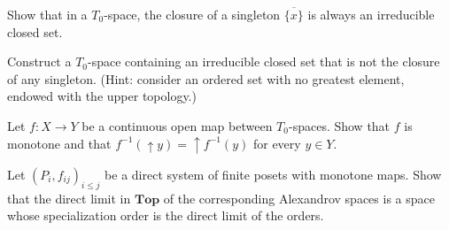\begin{exercise}
Show that in a $T_0$-space, the closure of a singleton $\overline{\{x\}}$ is always an
irreducible closed set.
\end{exercise}

\begin{exercise}
Construct a $T_0$-space containing an irreducible closed set that is not the closure of
any singleton. (Hint: consider an ordered set with no greatest element, endowed with the
upper topology.)
\end{exercise}

\begin{exercise}
Let $f\colon X \to Y$ be a continuous open map between $T_0$-spaces. Show that $f$ is
monotone and that $f^{-1}(\uparrow\! y) = \uparrow\! f^{-1}(y)$ for every $y \in Y$.
\end{exercise}

\begin{exercise}
Let $(P_i, f_{ij})_{i \leq j}$ be a direct system of finite posets with monotone maps.
Show that the direct limit in $\mathbf{Top}$ of the corresponding Alexandrov spaces is a
space whose specialization order is the direct limit of the orders.
\end{exercise}

